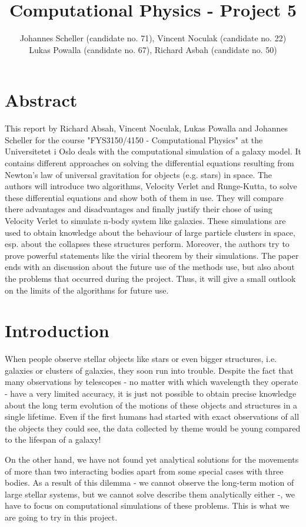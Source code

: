 \documentclass[10pt,a4paper]{article}
\author{Johannes Scheller (candidate no. 71), Vincent Noculak (candidate no. 22)\\ Lukas Powalla (candidate no. 67), Richard Asbah (candidate no. 50) }
\title{Computational Physics - Project 5}
\begin{document}
\maketitle
\newpage
\tableofcontents
\newpage

\section{Abstract}
This report by Richard Absah, Vincent Noculak, Lukas Powalla and Johannes Scheller for the course "FYS3150/4150 - Computational Physics" at the Universitetet i Oslo deals with the computational simulation of a galaxy model. It contains different approaches on solving the differential equations resulting from Newton's law of universal gravitation for objects (e.g. stars) in space. The authors will introduce two algorithms, Velocity Verlet and Runge-Kutta, to solve these differential equations and show both of them in use. They will compare there advantages and disadvantages and finally justify their chose of using Velocity Verlet to simulate n-body system like galaxies. These simulations are used to obtain knowledge about the behaviour of large particle clusters in space, esp. about the collapses these structures perform. Moreover, the authors try to prove powerful statements like the virial theorem by their simulations. The paper ends with an discussion about the future use of the methods use, but also about the problems that occurred during the project. Thus, it will give a small outlook on the limits of the algorithms for future use.

\section{Introduction}

When people observe stellar objects like stars or even bigger structures, i.e. galaxies or clusters of galaxies, they soon run into trouble. Despite the fact that many observations by telescopes - no matter with which wavelength they operate - have a very limited accuracy, it is just not possible to obtain precise knowledge about the long term evolution of the motions of these objects and structures in a single lifetime. Even if the first humans had started with exact observations of all the objects they could see, the data collected by theme would be young compared to the lifespan of a galaxy!

On the other hand, we have not found yet analytical solutions for the movements of more than two interacting bodies apart from some special cases with three bodies. As a result of this dilemma - we cannot observe the long-term motion of large stellar systems, but we cannot solve describe them analytically either -, we have to focus on computational simulations of these problems. This is what we are going to try in this project.
\end{document}
